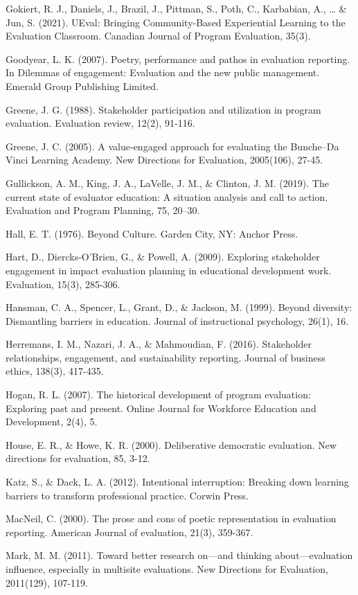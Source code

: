 \documentclass[
]{book}
\begin{document}
Gokiert, R. J., Daniels, J., Brazil, J., Pittman, S., Poth, C., Karbabian, A., \ldots{} \& Jun, S. (2021). UEval: Bringing Community-Based Experiential Learning to the Evaluation Classroom. Canadian Journal of Program Evaluation, 35(3).

Goodyear, L. K. (2007). Poetry, performance and pathos in evaluation reporting. In Dilemmas of engagement: Evaluation and the new public management. Emerald Group Publishing Limited.

Greene, J. G. (1988). Stakeholder participation and utilization in program evaluation. Evaluation review, 12(2), 91-116.

Greene, J. C. (2005). A value‐engaged approach for evaluating the Bunche--Da Vinci Learning Academy. New Directions for Evaluation, 2005(106), 27-45.

Gullickson, A. M., King, J. A., LaVelle, J. M., \& Clinton, J. M. (2019). The current state of evaluator education: A situation analysis and call to action. Evaluation and Program Planning, 75, 20--30.

Hall, E. T. (1976). Beyond Culture. Garden City, NY: Anchor Press.

Hart, D., Diercks-O'Brien, G., \& Powell, A. (2009). Exploring stakeholder engagement in impact evaluation planning in educational development work. Evaluation, 15(3), 285-306.

Hansman, C. A., Spencer, L., Grant, D., \& Jackson, M. (1999). Beyond diversity: Dismantling barriers in education. Journal of instructional psychology, 26(1), 16.

Herremans, I. M., Nazari, J. A., \& Mahmoudian, F. (2016). Stakeholder relationships, engagement, and sustainability reporting. Journal of business ethics, 138(3), 417-435.

Hogan, R. L. (2007). The historical development of program evaluation: Exploring past and present. Online Journal for Workforce Education and Development, 2(4), 5.

House, E. R., \& Howe, K. R. (2000). Deliberative democratic evaluation. New directions for evaluation, 85, 3-12.

Katz, S., \& Dack, L. A. (2012). Intentional interruption: Breaking down learning barriers to transform professional practice. Corwin Press.

MacNeil, C. (2000). The prose and cons of poetic representation in evaluation reporting. American Journal of evaluation, 21(3), 359-367.

Mark, M. M. (2011). Toward better research on---and thinking about---evaluation influence, especially in multisite evaluations. New Directions for Evaluation, 2011(129), 107-119.
\end{document}
